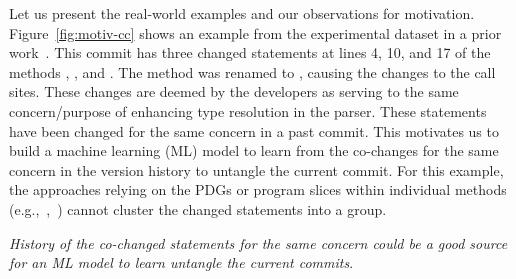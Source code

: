 
Let us present the real-world examples and our observations for
motivation. Figure~\ref{fig:motiv-cc} shows an example from the
experimental dataset in a prior work~\cite{flexeme-fse20}. This commit
has three changed statements at lines 4, 10, and 17 of the methods
, , and . The
method  was renamed to
, causing the changes to the call sites.
These changes are deemed by the developers as serving to the same
concern/purpose of enhancing type resolution in the parser. These
statements have been changed for the same concern in a past
commit. This motivates us to build a machine learning (ML) model to
learn from the co-changes for the same concern in the version history
to untangle the current commit. For this example, the approaches
relying on the PDGs or program slices within individual methods
(e.g.,~\cite{flexeme-fse20},~\cite{roover-scam18}) cannot cluster the
changed statements into a group.

 {\em History of the co-changed statements
for the same concern could be a good source for an ML model to learn
untangle the current commits}.

